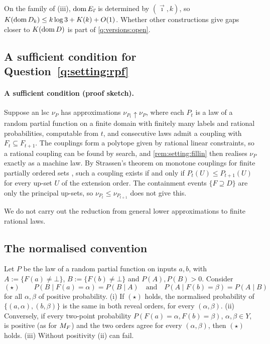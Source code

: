 On the family of (iii), $\operatorname{dom} E_{\vec\imath}$ is determined by $(\vec\imath,k)$, so $K(\operatorname{dom} D_k)\le k\log3+K(k)+O(1)$. Whether other constructions give gaps closer to $K(\operatorname{dom} D)$ is part of \cref{q:versions:open}.

\subsection{A sufficient condition for Question~\ref{q:setting:rpf}}\label{app:setting:rpf}

\paragraph{A sufficient condition (proof sketch).} Suppose an lsc $\nu_P$ has approximations $\nu_{P_t}\uparrow\nu_P$, where each $P_t$ is a law of a random partial function on a finite domain with finitely many labels and rational probabilities, computable from $t$, and consecutive laws admit a coupling with $F_t\subseteq F_{t+1}$. The couplings form a polytope given by rational linear constraints, so a rational coupling can be found by search, and \cref{rem:setting:fillin} then realises $\nu_P$ exactly as a machine law. By Strassen's theorem on monotone couplings for finite partially ordered sets \citep{strassen1965existence}, such a coupling exists if and only if $P_t(U)\le P_{t+1}(U)$ for every up-set $U$ of the extension order. The containment events $\{F\supseteq D\}$ are only the principal up-sets, so $\nu_{P_t}\le\nu_{P_{t+1}}$ does not give this.

We do not carry out the reduction from general lower approximations to finite rational laws.

\subsection{The normalised convention}\label{app:setting:normalised}

\begin{proposition}\label{prop:setting:twopoint}
Let $P$ be the law of a random partial function on inputs $a,b$, with $A:=\{F(a)\ne\bot\}$, $B:=\{F(b)\ne\bot\}$ and $P(A),P(B)>0$. Consider
\[
(\star)\qquad P(B\mid F(a)=\alpha)=P(B\mid A)\quad\text{and}\quad P(A\mid F(b)=\beta)=P(A\mid B)
\]
for all $\alpha,\beta$ of positive probability. (i) If $(\star)$ holds, the normalised probability of $\{(a,\alpha),(b,\beta)\}$ is the same in both reveal orders, for every $(\alpha,\beta)$. (ii) Conversely, if every two-point probability $P(F(a)=\alpha,F(b)=\beta)$, $\alpha,\beta\in Y$, is positive (as for $M_{F}$) and the two orders agree for every $(\alpha,\beta)$, then $(\star)$ holds. (iii) Without positivity (ii) can fail.
\end{proposition}

